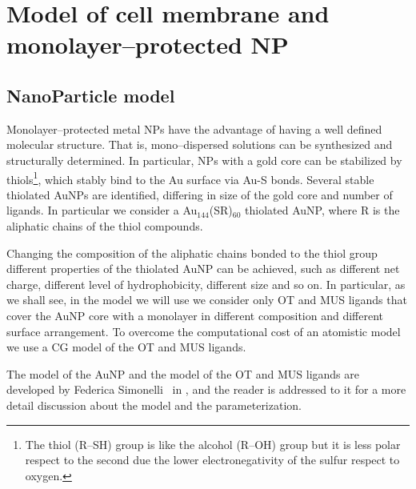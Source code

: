 \chapter{Model of cell membrane and monolayer--protected NP}
\label{chap:tre}

\section{NanoParticle model}
Monolayer--protected metal \acp{NP} have the advantage of having a well defined molecular structure. That is, mono--dispersed solutions can be synthesized and structurally determined. In particular, \acp{NP} with a gold core can be stabilized by thiols\footnote{The thiol (R--SH) group is like the alcohol (R--OH) group but it is less polar respect to the second due the lower electronegativity of the sulfur respect to oxygen.}, which stably bind to the Au surface via Au-S bonds. 
Several stable thiolated \acp{AuNP} are identified, differing in size of the gold core and number of ligands. In particular we consider a {Au$_{144}$(SR)$_{60}$} thiolated \ac{AuNP}, where R is the aliphatic chains of the thiol compounds. 

Changing the composition of the aliphatic chains bonded to the thiol group different properties of the thiolated \ac{AuNP} can be achieved, such as different net charge, different level of hydrophobicity, different size and so on. In particular, as we shall see, in the model we will use we consider only \ac{OT} and \ac{MUS} ligands that cover the \ac{AuNP} core with a monolayer in different composition and different surface arrangement. To overcome the computational cost of an atomistic model we use a \martini \ac{CG} model of the \ac{OT} and \ac{MUS} ligands. 

The model of the \ac{AuNP} and the \martini model of the \ac{OT} and \ac{MUS} ligands are developed by Federica Simonelli \etal\, in \cite{ourPaper}, and the reader is addressed to it for a more detail discussion about the model and the parameterization.


